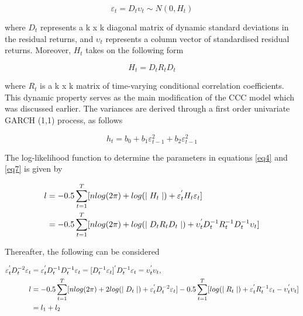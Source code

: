 \documentclass[11pt,preprint, authoryear]{elsarticle}
\numberwithin{equation}{section}
\numberwithin{figure}{section}
\numberwithin{table}{section}
\begin{document}
\begin{equation}
\varepsilon_t = D_t \upsilon_t \sim N(0, H_t)
\label{eq2}
\end{equation}

where \(D_t\) represents a k x k diagonal matrix of dynamic standard
deviations in the residual returns, and \(\upsilon_t\) represents a
column vector of standardised residual returns. Moreover, \(H_t\) takes
on the following form

\begin{equation}
H_t = D_t R_t D_t
\label{eq3}
\end{equation}

where \(R_t\) is a k x k matrix of time-varying conditional correlation
coefficients. This dynamic property serves as the main modification of
the CCC model which was discussed earlier. The variances are derived
through a first order univariate GARCH (1,1) process, as follows

\begin{equation}
h_t = b_0 + b_1\varepsilon_{t-1}^{2} + b_2\varepsilon_{t-1}^{2}
\label{eq4}
\end{equation}

The log-likelihood function to determine the parameters in equations
\ref{eq4} and \ref{eq7} is given by

\begin{align} \label{eq5}
l &= -0.5 \sum_{t=1}^{T}[n log(2\pi) + log(\mid H_t \mid) + \varepsilon_t^{'} H_t \varepsilon_t] \hfill  \\ \notag
                     &= -0.5 \sum_{t=1}^{T}[n log(2\pi) + log(\mid D_t R_t D_t \mid) + \upsilon_t^{'}D_t^{-1}R_t^{-1}D_t^{-1}\upsilon_t] \notag
                           \end{align}

Thereafter, the following can be considered

\begin{align} \label{eq6}
 \varepsilon_t^{'} D_t^{-2} \varepsilon_t &=  \varepsilon_t^{'} D_t^{-1} D_t^{-1} \varepsilon_t = [D_t^{-1} \varepsilon_t]^{'}D_t^{-1}\varepsilon_t = \upsilon_t^{'}\upsilon_t, \hfill  \\ \notag
                     l &= -0.5 \sum_{t=1}^{T} [nlog(2\pi) + 2log( \mid D_t \mid) + \varepsilon_t^{'} D_t^{-2} \varepsilon_t] -0.5 \sum_{t=1}^{T} [log(\mid R_t \mid) + \varepsilon_t^{'}R_t^{-1} \varepsilon_t - \upsilon_t^{'}\upsilon_t] \hfill \\ \notag
                     &= l_1 + l_2
                           \end{align}
\end{document}

